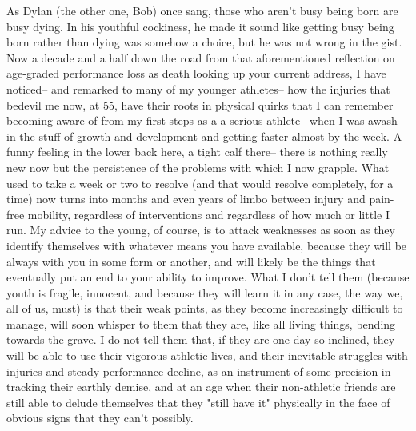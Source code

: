 As Dylan (the other one, Bob) once sang, those who aren't busy being born are busy dying. In his youthful cockiness, he made it sound like getting busy being born rather than dying was somehow a choice, but he was not wrong in the gist. Now a decade and a half down the road from that aforementioned reflection on age-graded performance loss as death looking up your current address, I have noticed-- and remarked to many of my younger athletes-- how the injuries that bedevil me now, at 55, have their roots in physical quirks that I can remember becoming aware of from my first steps as a a serious athlete-- when I was awash in the stuff of growth and development and getting faster almost by the week. A funny feeling in the lower back here, a tight calf there-- there is nothing really new now but the persistence of the problems with which I now grapple. What used to take a week or two to resolve (and that would resolve completely, for a time) now turns into months and even years of limbo between injury and pain-free mobility, regardless of interventions and regardless of how much or little I run. My advice to the young, of course, is to attack weaknesses as soon as they identify themselves with whatever means you have available, because they will be always with you in some form or another, and will likely be the things that eventually put an end to your ability to improve. What I don't tell them (because youth is fragile, innocent, and because they will learn it in any case, the way we, all of us, must) is that their weak points, as they become increasingly difficult to manage, will soon whisper to them that they are, like all living things, bending towards the grave. I do not tell them that, if they are one day so inclined, they will be able to use their vigorous athletic lives, and their inevitable struggles with injuries and steady performance decline, as an instrument of some precision in tracking their earthly demise, and at an age when their non-athletic friends are still able to delude themselves that they "still have it" physically in the face of obvious signs that they can't possibly.

